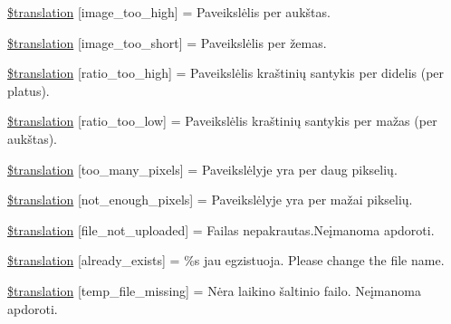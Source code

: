 \begin{DoxyCompactItemize}
\hyperlink{class_8upload_8lt___l_t_8php_aa27bde361343f3b63c7cd441860024f8}{\$translation} \mbox{[}\textquotesingle{}image\+\_\+too\+\_\+high\textquotesingle{}\mbox{]} = \textquotesingle{}Paveikslėlis per aukštas.\textquotesingle{}
\item 
\hyperlink{class_8upload_8lt___l_t_8php_a86fcd4e1157b00032df451188d735527}{\$translation} \mbox{[}\textquotesingle{}image\+\_\+too\+\_\+short\textquotesingle{}\mbox{]} = \textquotesingle{}Paveikslėlis per žemas.\textquotesingle{}
\item 
\hyperlink{class_8upload_8lt___l_t_8php_a23396f6ce7f31e5e5f1b57580621d982}{\$translation} \mbox{[}\textquotesingle{}ratio\+\_\+too\+\_\+high\textquotesingle{}\mbox{]} = \textquotesingle{}Paveikslėlis kraštinių santykis per didelis (per platus).\textquotesingle{}
\item 
\hyperlink{class_8upload_8lt___l_t_8php_ac533b9a479f056b0b8623e4268f068c2}{\$translation} \mbox{[}\textquotesingle{}ratio\+\_\+too\+\_\+low\textquotesingle{}\mbox{]} = \textquotesingle{}Paveikslėlis kraštinių santykis per mažas (per aukštas).\textquotesingle{}
\item 
\hyperlink{class_8upload_8lt___l_t_8php_aa4051ef64e94a3f8295c63cf85544016}{\$translation} \mbox{[}\textquotesingle{}too\+\_\+many\+\_\+pixels\textquotesingle{}\mbox{]} = \textquotesingle{}Paveikslėlyje yra per daug pikselių.\textquotesingle{}
\item 
\hyperlink{class_8upload_8lt___l_t_8php_a1fe342c27ce61f4ff4e0120ba647033e}{\$translation} \mbox{[}\textquotesingle{}not\+\_\+enough\+\_\+pixels\textquotesingle{}\mbox{]} = \textquotesingle{}Paveikslėlyje yra per mažai pikselių.\textquotesingle{}
\item 
\hyperlink{class_8upload_8lt___l_t_8php_a4ce76e7be0b3a03c2b47f6d70c21832e}{\$translation} \mbox{[}\textquotesingle{}file\+\_\+not\+\_\+uploaded\textquotesingle{}\mbox{]} = \textquotesingle{}Failas nepakrautas.\+Neįmanoma apdoroti.\textquotesingle{}
\item 
\hyperlink{class_8upload_8lt___l_t_8php_afd84e910217f04139f567c41e292afa5}{\$translation} \mbox{[}\textquotesingle{}already\+\_\+exists\textquotesingle{}\mbox{]} = \textquotesingle{}\%s jau egzistuoja. Please change the file name.\textquotesingle{}
\item 
\hyperlink{class_8upload_8lt___l_t_8php_ab0fa87a88aba2624004581eed0633325}{\$translation} \mbox{[}\textquotesingle{}temp\+\_\+file\+\_\+missing\textquotesingle{}\mbox{]} = \textquotesingle{}Nėra laikino šaltinio failo. Neįmanoma apdoroti.\textquotesingle{}

\end{DoxyCompactItemize}
